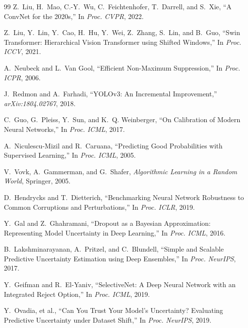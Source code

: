 \documentclass[11pt,a4paper]{article}
\begin{document}
\begin{thebibliography}{99}
Z.~Liu, H.~Mao, C.-Y.~Wu, C.~Feichtenhofer, T.~Darrell, and S.~Xie,
\newblock ``A ConvNet for the 2020s,''
\newblock In \emph{Proc. CVPR}, 2022.

Z.~Liu, Y.~Lin, Y.~Cao, H.~Hu, Y.~Wei, Z.~Zhang, S.~Lin, and B.~Guo,
\newblock ``Swin Transformer: Hierarchical Vision Transformer using Shifted Windows,''
\newblock In \emph{Proc. ICCV}, 2021.

A.~Neubeck and L.~Van Gool,
\newblock ``Efficient Non-Maximum Suppression,''
\newblock In \emph{Proc. ICPR}, 2006.

J.~Redmon and A.~Farhadi,
\newblock ``YOLOv3: An Incremental Improvement,''
\newblock \emph{arXiv:1804.02767}, 2018.

C.~Guo, G.~Pleiss, Y.~Sun, and K.~Q. Weinberger,
\newblock ``On Calibration of Modern Neural Networks,''
\newblock In \emph{Proc. ICML}, 2017.

A.~Niculescu-Mizil and R.~Caruana,
\newblock ``Predicting Good Probabilities with Supervised Learning,''
\newblock In \emph{Proc. ICML}, 2005.

V.~Vovk, A.~Gammerman, and G.~Shafer,
\newblock \emph{Algorithmic Learning in a Random World},
\newblock Springer, 2005.

D.~Hendrycks and T.~Dietterich,
\newblock ``Benchmarking Neural Network Robustness to Common Corruptions and Perturbations,''
\newblock In \emph{Proc. ICLR}, 2019.

Y.~Gal and Z.~Ghahramani,
\newblock ``Dropout as a Bayesian Approximation: Representing Model Uncertainty in Deep Learning,''
\newblock In \emph{Proc. ICML}, 2016.

B.~Lakshminarayanan, A.~Pritzel, and C.~Blundell,
\newblock ``Simple and Scalable Predictive Uncertainty Estimation using Deep Ensembles,''
\newblock In \emph{Proc. NeurIPS}, 2017.

Y.~Geifman and R.~El-Yaniv,
\newblock ``SelectiveNet: A Deep Neural Network with an Integrated Reject Option,''
\newblock In \emph{Proc. ICML}, 2019.

Y.~Ovadia, et al.,
\newblock ``Can You Trust Your Model's Uncertainty? Evaluating Predictive Uncertainty under Dataset Shift,''
\newblock In \emph{Proc. NeurIPS}, 2019.


\end{thebibliography}
\end{document}
